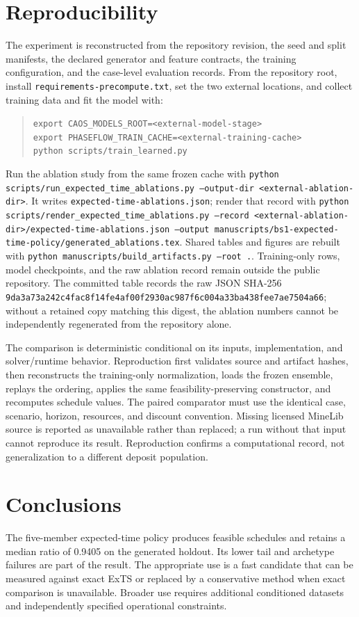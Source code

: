 \documentclass[11pt]{article}
\begin{document}
\section{Reproducibility}
The experiment is reconstructed from the repository revision, the seed and split manifests, the declared generator and feature contracts, the training configuration, and the case-level evaluation records. From the repository root, install \texttt{requirements-precompute.txt}, set the two external locations, and collect training data and fit the model with:
\begin{quote}\footnotesize
\texttt{export CAOS\_MODELS\_ROOT=<external-model-stage>}\\
\texttt{export PHASEFLOW\_TRAIN\_CACHE=<external-training-cache>}\\
\texttt{python scripts/train\_learned.py}
\end{quote}
Run the ablation study from the same frozen cache with \texttt{python scripts/run\_expected\_time\_ablations.py --output-dir <external-ablation-dir>}. It writes \texttt{expected-time-ablations.json}; render that record with \texttt{python scripts/render\_expected\_time\_ablations.py --record <external-ablation-dir>/expected-time-ablations.json --output manuscripts/bs1-expected-time-policy/generated\_ablations.tex}. Shared tables and figures are rebuilt with \texttt{python manuscripts/build\_artifacts.py --root .}. Training-only rows, model checkpoints, and the raw ablation record remain outside the public repository. The committed table records the raw JSON SHA-256 \texttt{9da3a73a242c4fac8f14fe4af00f2930ac987f6c004a33ba438fee7ae7504a66}; without a retained copy matching this digest, the ablation numbers cannot be independently regenerated from the repository alone.

The comparison is deterministic conditional on its inputs, implementation, and solver/runtime behavior. Reproduction first validates source and artifact hashes, then reconstructs the training-only normalization, loads the frozen ensemble, replays the ordering, applies the same feasibility-preserving constructor, and recomputes schedule values. The paired comparator must use the identical case, scenario, horizon, resources, and discount convention. Missing licensed MineLib source is reported as unavailable rather than replaced; a run without that input cannot reproduce its result. Reproduction confirms a computational record, not generalization to a different deposit population.

\section{Conclusions}
The five-member expected-time policy produces feasible schedules and retains a median ratio of 0.9405 on the generated holdout. Its lower tail and archetype failures are part of the result. The appropriate use is a fast candidate that can be measured against exact ExTS or replaced by a conservative method when exact comparison is unavailable. Broader use requires additional conditioned datasets and independently specified operational constraints.
\end{document}
